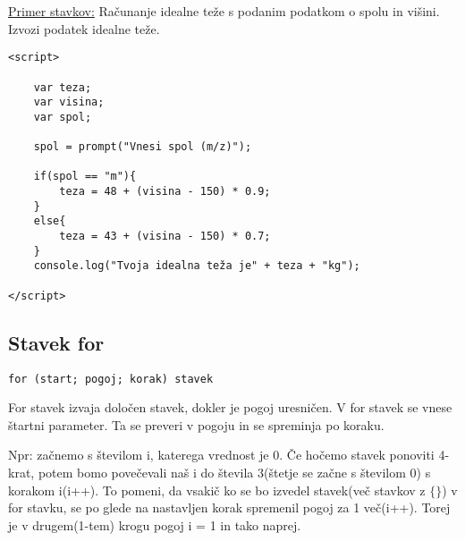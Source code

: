 \newpage
\underline{Primer stavkov:}
Računanje idealne teže s podanim podatkom o spolu in višini. Izvozi podatek idealne teže.
\begin{verbatim}
<script>

    var teza;
    var visina;
    var spol;

    spol = prompt("Vnesi spol (m/z)");

    if(spol == "m"){
        teza = 48 + (visina - 150) * 0.9;
    }
    else{
        teza = 43 + (visina - 150) * 0.7;    
    }
    console.log("Tvoja idealna teža je" + teza + "kg");
    
</script>
\end{verbatim}

\subsection{Stavek for}

\texttt{for (start; pogoj; korak) stavek}

For stavek izvaja določen stavek, dokler je pogoj uresničen. V for stavek se vnese štartni parameter. Ta se preveri v pogoju in se spreminja po koraku.


Npr: začnemo s številom i, katerega vrednost je 0. Če hočemo stavek ponoviti 4-krat, potem bomo povečevali naš i do števila 3(štetje se začne s številom 0) s korakom i(i++). To pomeni, da vsakič ko se bo izvedel stavek(več stavkov z $\{\}$) v for stavku, se po glede na nastavljen korak spremenil pogoj za 1 več(i++). Torej je v drugem(1-tem) krogu pogoj i = 1 in tako naprej.

